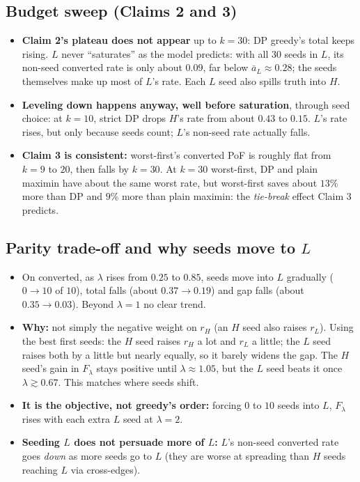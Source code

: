 \documentclass[11pt]{article}
\begin{document}
\subsection{Budget sweep (Claims 2 and 3)}
\begin{itemize}
\item \textbf{Claim 2's plateau does not appear} up to $k=30$: DP greedy's total keeps rising. $L$ never ``saturates'' as the model predicts: with all 30 seeds in $L$, its non-seed converted rate is only about $0.09$, far below $\bar a_L\approx0.28$; the seeds themselves make up most of $L$'s rate. Each $L$ seed also spills truth into $H$.
\item \textbf{Leveling down happens anyway, well before saturation}, through seed choice: at $k=10$, strict DP drops $H$'s rate from about $0.43$ to $0.15$. $L$'s rate rises, but only because seeds count; $L$'s non-seed rate actually falls.
\item \textbf{Claim 3 is consistent:} worst-first's converted PoF is roughly flat from $k=9$ to $20$, then falls by $k=30$. At $k=30$ worst-first, DP and plain maximin have about the same worst rate, but worst-first saves about $13\%$ more than DP and $9\%$ more than plain maximin: the \emph{tie-break} effect Claim 3 predicts.
\end{itemize}

\subsection{Parity trade-off and why seeds move to $L$}
\begin{itemize}
\item On converted, as $\lambda$ rises from $0.25$ to $0.85$, seeds move into $L$ gradually ($0\to10$ of $10$), total falls (about $0.37\to0.19$) and gap falls (about $0.35\to0.03$). Beyond $\lambda=1$ no clear trend.
\item \textbf{Why:} not simply the negative weight on $r_H$ (an $H$ seed also raises $r_L$). Using the best first seeds: the $H$ seed raises $r_H$ a lot and $r_L$ a little; the $L$ seed raises both by a little but nearly equally, so it barely widens the gap. The $H$ seed's gain in $F_\lambda$ stays positive until $\lambda\approx1.05$, but the $L$ seed beats it once $\lambda\gtrsim0.67$. This matches where seeds shift.
\item \textbf{It is the objective, not greedy's order:} forcing $0$ to $10$ seeds into $L$, $F_\lambda$ rises with each extra $L$ seed at $\lambda=2$.
\item \textbf{Seeding $L$ does not persuade more of $L$:} $L$'s non-seed converted rate goes \emph{down} as more seeds go to $L$ (they are worse at spreading than $H$ seeds reaching $L$ via cross-edges).
\end{itemize}
\end{document}
